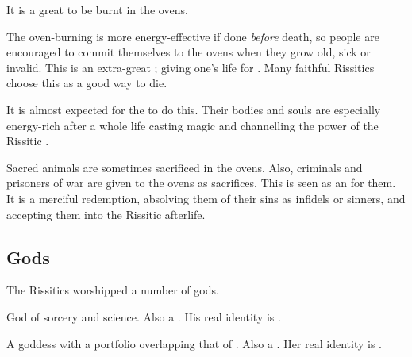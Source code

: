 It is a great \honour to be burnt in the ovens.

The oven-burning is more energy-effective if done \emph{before} death, so people are encouraged to commit themselves to the ovens when they grow old, sick or invalid. 
This is an extra-great \honour; giving one's life for \Nechsain. 
Many faithful Rissitics choose this as a good way to die. 

It is almost expected for the \nyzlet{} to do this. 
Their bodies and souls are especially energy-rich after a whole life casting magic and channelling the power of the Rissitic \matrix. 

Sacred animals are sometimes sacrificed in the ovens. 
Also, criminals and prisoners of war are given to the ovens as sacrifices. 
This is seen as an \honour for them. 
It is a merciful redemption, absolving them of their sins as infidels or sinners, and accepting them into the Rissitic afterlife. 









\subsection{Gods}
The Rissitics worshipped a number of gods. 


\begin{gloss}  
  \begin{comment}
  \subparagraph{Rissit}
  \end{comment}
  God of sorcery and science. 
  Also a .
  His real identity is . 

  
  
  \begin{comment}
  \subparagraph{\Usherain}
  \end{comment}
  \gitemlink[Usherain]{\Usherain}
  \index{\Usherain}
  A goddess with a portfolio overlapping that of . 
  Also a .
  Her real identity is . 



\end{gloss}









